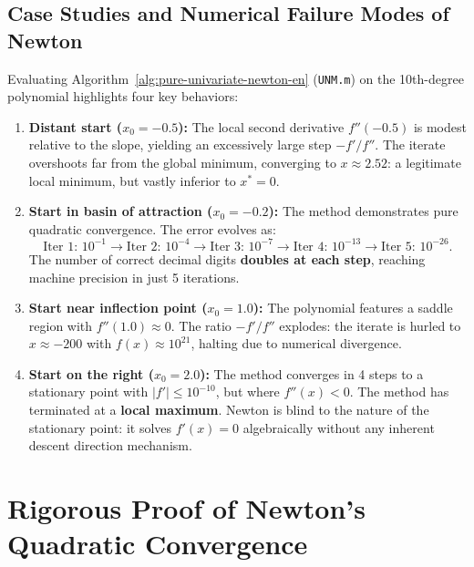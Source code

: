 \subsection{Case Studies and Numerical Failure Modes of Newton}
Evaluating Algorithm~\ref{alg:pure-univariate-newton-en} (\texttt{UNM.m}) on the 10th-degree polynomial highlights four key behaviors:
\begin{enumerate}
    \item \textbf{Distant start ($x_0 = -0.5$):} The local second derivative $f''(-0.5)$ is modest relative to the slope, yielding an excessively large step $-f'/f''$. The iterate overshoots far from the global minimum, converging to $x \approx 2.52$: a legitimate local minimum, but vastly inferior to $x^* = 0$.
    \item \textbf{Start in basin of attraction ($x_0 = -0.2$):} The method demonstrates pure quadratic convergence. The error evolves as:
    \begin{equation}
        \text{Iter 1: } 10^{-1} \longrightarrow \text{Iter 2: } 10^{-4} \longrightarrow \text{Iter 3: } 10^{-7} \longrightarrow \text{Iter 4: } 10^{-13} \longrightarrow \text{Iter 5: } 10^{-26}.
    \end{equation}
    The number of correct decimal digits \textbf{doubles at each step}, reaching machine precision in just 5 iterations.
    \item \textbf{Start near inflection point ($x_0 = 1.0$):} The polynomial features a saddle region with $f''(1.0) \approx 0$. The ratio $-f'/f''$ explodes: the iterate is hurled to $x \approx -200$ with $f(x) \approx 10^{21}$, halting due to numerical divergence.
    \item \textbf{Start on the right ($x_0 = 2.0$):} The method converges in 4 steps to a stationary point with $|f'| \le 10^{-10}$, but where $f''(x) < 0$. The method has terminated at a \textbf{local maximum}. Newton is blind to the nature of the stationary point: it solves $f'(x) = 0$ algebraically without any inherent descent direction mechanism.
\end{enumerate}

\FloatBarrier
\section{Rigorous Proof of Newton's Quadratic Convergence}
\label{sec:univariate-newton-proof-en}

